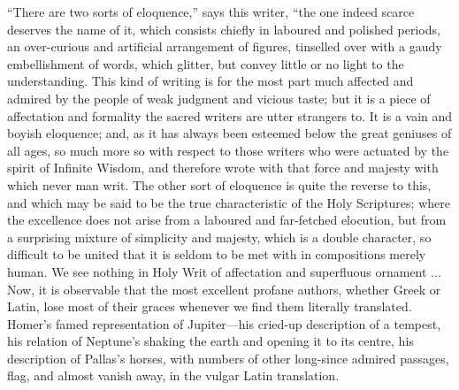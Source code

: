 ``There are two sorts of eloquence,'' says this writer,
``the one indeed scarce deserves the name of it, which consists
chiefly in laboured and polished periods, an over-curious and
artificial arrangement of figures, tinselled over with a gaudy
embellishment of words, which glitter, but convey little or no light
to the understanding. This kind of writing is for the most part much
affected and admired by the people of weak judgment and vicious taste;
but it is a piece of affectation and formality the sacred writers are
utter strangers to. It is a vain and boyish eloquence; and, as it has
always been esteemed below the great geniuses of all ages, so much
more so with respect to those writers who were actuated by the spirit
of Infinite Wisdom, and therefore wrote with that force and majesty
with which never man writ. The other sort of eloquence is quite the
reverse to this, and which may be said to be the true characteristic
of the Holy Scriptures; where the excellence does not arise from a
laboured and far-fetched elocution, but from a surprising mixture of
simplicity and majesty, which is a double character, so difficult to
be united that it is seldom to be met with in compositions merely
human. We see nothing in Holy Writ of affectation and superfluous
ornament ... Now, it is observable that the most excellent
profane authors, whether Greek or Latin, lose most of their graces
whenever we find them literally translated. Homer's famed
representation of Jupiter—his cried-up description of a tempest, his
relation of Neptune's shaking the earth and opening it to its centre,
his description of Pallas's horses, with numbers of other long-since
admired passages, flag, and almost vanish away, in the vulgar Latin
translation.

